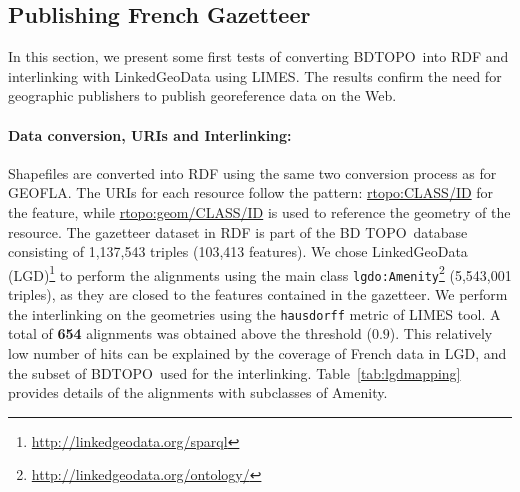 \subsection{Publishing  French Gazetteer} \label{sec:bdtopo}
In this section, we present some first tests of converting BDTOPO\circledR ~into RDF and interlinking with LinkedGeoData using LIMES. The results confirm the need for geographic publishers to publish georeference data on the Web.

\paragraph{Data conversion, URIs and Interlinking:}
Shapefiles are converted into RDF using the same two conversion process as for GEOFLA\circledR. The URIs for each resource follow the pattern: \url{rtopo:CLASS/ID} for the feature, while  \url{rtopo:geom/CLASS/ID} is used to reference the geometry of the resource. The gazetteer dataset in RDF is part of the BD TOPO\circledR ~database consisting of  1,137,543 triples (103,413 features). We chose LinkedGeoData (LGD)\footnote{\url{http://linkedgeodata.org/sparql}} to perform the alignments using the main class \texttt{lgdo:Amenity}\footnote{\url{http://linkedgeodata.org/ontology/}} (5,543,001 triples), as they are closed to the features contained in the gazetteer. We perform the interlinking on the geometries using the \texttt{hausdorff} metric of LIMES tool. A total of \textbf{654} alignments was obtained above the threshold ($0.9$). This relatively low number of hits can be explained by the coverage of French data in LGD, and the subset of BDTOPO\circledR  ~used for the interlinking. Table~\ref{tab:lgdmapping} provides details of the alignments with subclasses of Amenity.

\begin{table}[!htbp]
\end{table}

